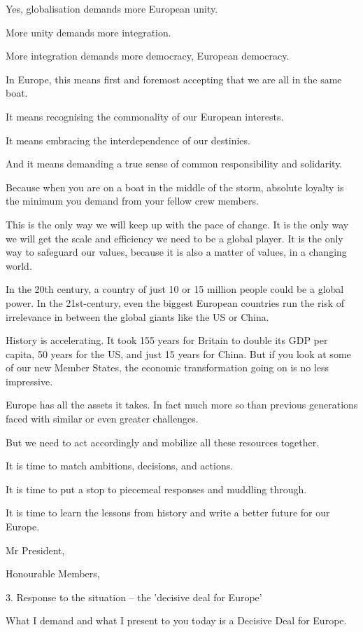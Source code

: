 \documentclass[a4paper,11pt]{article}
\begin{document}
Yes, globalisation demands more European unity.

More unity demands more integration.

More integration demands more democracy, European democracy.

In Europe, this means first and foremost accepting that we are all in the same boat.

It means recognising the commonality of our European interests.

It means embracing the interdependence of our destinies.

And it means demanding a true sense of common responsibility and solidarity.

Because when you are on a boat in the middle of the storm, absolute loyalty is the minimum you demand from your fellow crew members.

This is the only way we will keep up with the pace of change. It is the only way we will get the scale and efficiency we need to be a global player. It is the only way to safeguard our values, because it is also a matter of values, in a changing world.

In the 20th century, a country of just 10 or 15 million people could be a global power. In the 21st-century, even the biggest European countries run the risk of irrelevance in between the global giants like the US or China.

History is accelerating. It took 155 years for Britain to double its GDP per capita, 50 years for the US, and just 15 years for China. But if you look at some of our new Member States, the economic transformation going on is no less impressive.

Europe has all the assets it takes. In fact much more so than previous generations faced with similar or even greater challenges.

But we need to act accordingly and mobilize all these resources together.

It is time to match ambitions, decisions, and actions.

It is time to put a stop to piecemeal responses and muddling through.

It is time to learn the lessons from history and write a better future for our Europe.

Mr President,

Honourable Members,

3. Response to the situation – the 'decisive deal for Europe'

What I demand and what I present to you today is a Decisive Deal for Europe.
\end{document}
